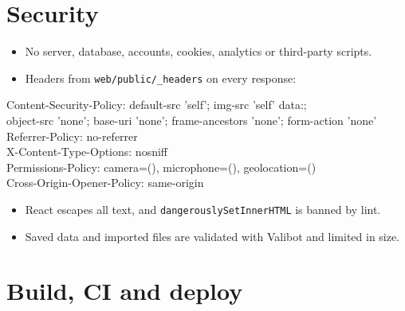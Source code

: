 \documentclass[11pt]{article}
\begin{document}
\section{Security}
\begin{itemize}
  \item No server, database, accounts, cookies, analytics or third-party scripts.
  \item Headers from \texttt{web/public/\_headers} on every response:
\end{itemize}
\begin{tcolorbox}[colback=desk, colframe=desk, arc=0pt, fontupper=\ttfamily\footnotesize]
Content-Security-Policy: default-src 'self'; img-src 'self' data:;\\
\hspace*{4mm}object-src 'none'; base-uri 'none'; frame-ancestors 'none'; form-action 'none'\\
Referrer-Policy: no-referrer\\
X-Content-Type-Options: nosniff\\
Permissions-Policy: camera=(), microphone=(), geolocation=()\\
Cross-Origin-Opener-Policy: same-origin
\end{tcolorbox}
\begin{itemize}
  \item React escapes all text, and \texttt{dangerouslySetInnerHTML} is banned by lint.
  \item Saved data and imported files are validated with Valibot and limited in size.
\end{itemize}

\section{Build, CI and deploy}
\begin{center}
\end{center}
\end{document}
